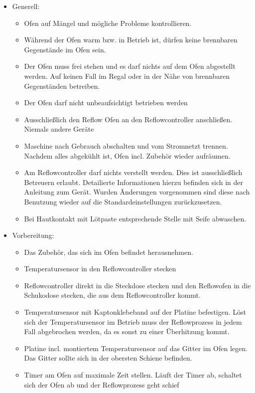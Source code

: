\documentclass[fontsize=9pt]{scrartcl}
\newenvironment{smallitemize}{\begin{itemize}\itemsep -3pt}{\end{itemize}}
\begin{document}
\begin{itemize}
	\item Generell:
	\begin{smallitemize}
		\item Ofen auf Mängel und mögliche Probleme kontrollieren.
		\item Während der Ofen warm bzw. in Betrieb ist, dürfen keine brennbaren Gegenstände im Ofen sein. 
		\item Der Ofen muss frei stehen und es darf nichts auf dem Ofen abgestellt werden. Auf keinen Fall im Regal oder in 
		der Nähe von brennbaren Gegenständen betreiben.
		\item Der Ofen darf nicht unbeaufsichtigt betrieben werden
		\item Ausschließlich den Reflow Ofen an den Reflowcontroller anschließen. Niemals andere Geräte
		\item Maschine nach Gebrauch abschalten und vom Stromnetzt trennen. Nachdem alles abgekühlt ist, Ofen incl. Zubehör wieder aufräumen.
		\item Am Reflowcontroller darf nichts verstellt werden. Dies ist ausschließlich Betreuern erlaubt. Detailierte Informationen hierzu 
		befinden sich in der Anleitung zum Gerät. Wurden Änderungen vorgenommen sind diese nach Benutzung wieder auf die Standardeinstellungen zurückzusetzen.
		\item Bei Hautkontakt mit Lötpaste entsprechende Stelle mit Seife abwaschen. 
		\end{smallitemize}
	\item Vorbereitung:
	\begin{smallitemize}
		\item Das Zubehör, das sich im Ofen befindet herausnehmen.
		\item Temperatursensor in den Reflowcontroller stecken
		\item Reflowcontroller direkt in die Steckdose stecken und den Reflowofen in die Schukodose stecken, die aus dem Reflowcontroller kommt.
		\item Temperatursensor mit Kaptonklebeband auf der Platine befestigen. Löst sich der Temperatursensor im Betrieb muss der Reflowprozess in
		jedem Fall abgebrochen werden, da es sonst zu einer Überhitzung kommt.
		\item Platine incl. montiertem Temperatursensor auf das Gitter im Ofen legen. Das Gitter sollte sich in der obersten Schiene befinden.
		\item Timer am Ofen auf maximale Zeit stellen. Läuft der Timer ab, schaltet sich der Ofen ab und der Reflowprozess geht schief


\end{smallitemize}
\end{itemize}
\end{document}
